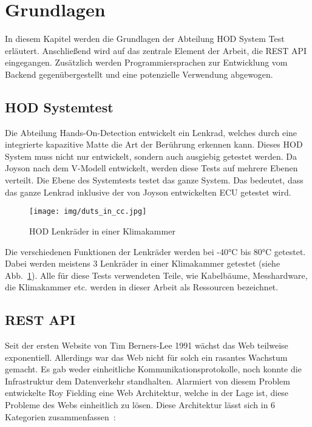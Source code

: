 \section{Grundlagen}
In diesem Kapitel werden die Grundlagen der Abteilung \gls{HOD} System Test erläutert.
Anschließend wird auf das zentrale Element der Arbeit, die REST API eingegangen.
Zusätzlich werden Programmiersprachen zur Entwicklung vom \gls{Backend} 
gegenübergestellt und eine potenzielle Verwendung abgewogen.

\subsection{HOD Systemtest}
Die Abteilung Hands-On-Detection entwickelt ein Lenkrad, welches durch eine 
integrierte kapazitive Matte die Art der Berührung erkennen kann.
Dieses \gls{HOD} System muss nicht nur entwickelt, sondern auch ausgiebig getestet werden.
Da Joyson nach dem V-Modell entwickelt, werden diese Tests auf mehrere Ebenen verteilt.
Die Ebene des Systemtests testet das ganze System. Das bedeutet, dass das ganze
Lenkrad inklusive der von Joyson entwickelten \gls{ECU} getestet wird.

\begin{figure}[H]
    \texttt{[image: img/duts\_in\_cc.jpg]}
    \centering
    \caption{HOD Lenkräder in einer Klimakammer}\label{fig:cc}
\end{figure}

Die verschiedenen Funktionen der Lenkräder werden bei -40°C bis 80°C getestet.
Dabei werden meistens 3 Lenkräder in einer Klimakammer getestet (siehe Abb.~\ref{fig:cc}).
Alle für diese Tests verwendeten Teile, wie Kabelbäume, Messhardware, die 
Klimakammer etc. werden in dieser Arbeit als Ressourcen bezeichnet.

\newpage

\subsection{REST API}\label{sec:restapi}
Seit der ersten Website von Tim Berners-Lee 1991 wächst das Web teilweise 
exponentiell. Allerdings war das Web nicht für solch ein rasantes Wachstum gemacht.
Es gab weder einheitliche Kommunikationsprotokolle, noch konnte die Infrastruktur
dem Datenverkehr standhalten. Alarmiert von diesem Problem entwickelte Roy Fielding
eine Web Architektur, welche in der Lage ist, diese Probleme des Webs einheitlich zu lösen.
Diese Architektur lässt sich in 6 Kategorien zusammenfassen~\cite{Mas11}:

